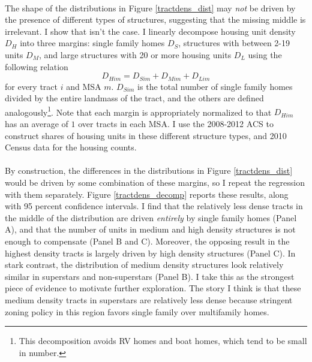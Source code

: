 \documentclass[]{article}
\theoremstyle{plain}
\begin{document}
\paragraph*{}
 The shape of the distributions in Figure \ref{tractdens_dist} may \textit{not} be driven by the presence of different types of structures, suggesting that the missing middle is irrelevant. I show that isn't the case. I linearly decompose housing unit density $D_{H}$ into three margins: single family homes $D_{S}$, structures with between 2-19 units $D_{M}$, and large structures with 20 or more housing units $D_{L}$ using the following relation 
 \begin{equation}\label{Unit_decomp}
 	D_{Him} = D_{Sim} + D_{Mim} + D_{Lim} 
 \end{equation}
for every tract $i$ and MSA $m$. $D_{Sim}$ is the total number of single family homes divided by the entire landmass of the tract, and the others are defined analogously\footnote{This decomposition avoids RV homes and boat homes, which tend to be small in number.}. Note that each margin is appropriately normalized to that $D_{Him}$ has an average of $1$ over tracts in each MSA. I use the 2008-2012 ACS to construct shares of housing units in these different structure types, and 2010 Census data for the housing counts. 
\paragraph*{}
 By construction, the differences in the distributions in Figure \ref{tractdens_dist} would be driven by some combination of these margins, so I repeat the regression with them separately. Figure \ref{tractdens_decomp} reports these results, along with 95 percent confidence intervals.  I find that the relatively less dense tracts in the middle of the distribution are driven \textit{entirely} by single family homes (Panel A), and that the number of units in medium and high density structures is not enough to compensate (Panel B and C). Moreover, the opposing result in the highest density tracts is largely driven by high density structures (Panel C). In stark contrast, the distribution of medium density structures look relatively similar in superstars and non-superstars (Panel B). I take this as the strongest piece of evidence to motivate further exploration. The story I think is that these medium density tracts in superstars are relatively less dense because stringent zoning policy in this region favors single family over multifamily homes.
\end{document}
